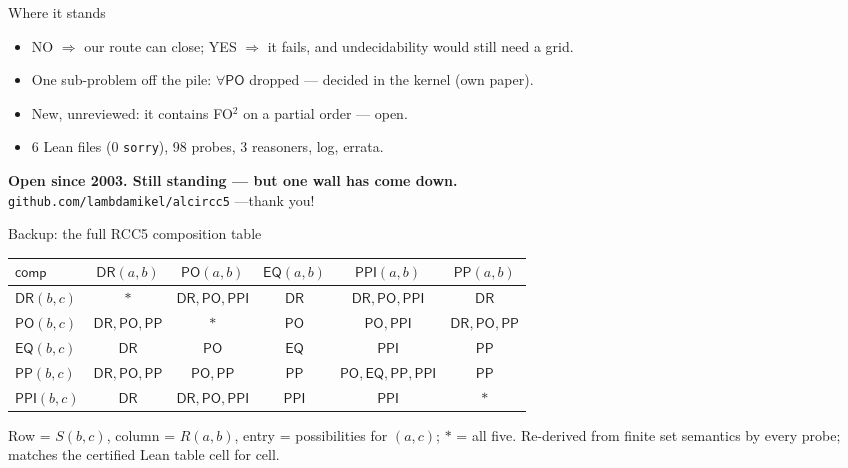 \documentclass[aspectratio=169,11pt]{beamer}
\newcommand{\DR}{\mathsf{DR}}
\newcommand{\PO}{\mathsf{PO}}
\newcommand{\PP}{\mathsf{PP}}
\newcommand{\PPI}{\mathsf{PPI}}
\newcommand{\EQ}{\mathsf{EQ}}
\newcommand{\comp}{\ensuremath{\mathsf{comp}}}
\begin{document}
\begin{frame}{Where it stands}
\begin{center}
\end{center}
\begin{itemize}
  \item NO $\Rightarrow$ our route can close; YES $\Rightarrow$ it fails, and
        undecidability would still need a grid.
  \item One \alert{sub-problem off the pile}: $\forall\PO$ dropped ---
        decided in the kernel (own paper).
  \item New, unreviewed: it \alert{contains} FO$^2$ on a partial order --- open.
  \item 6 Lean files (0 \texttt{sorry}), 98 probes, 3 reasoners, log, errata.
\end{itemize}
\vfill
\begin{center}
  \alert{\textbf{Open since 2003. Still standing --- but one wall has come
  down.}}\\[3pt]
  \small\texttt{github.com/lambdamikel/alcircc5} \quad---\quad thank you!
\end{center}
\end{frame}

\appendix
\begin{frame}{Backup: the full RCC5 composition table}
\begin{center}
\renewcommand{\arraystretch}{1.2}
\small
\begin{tabular}{l|ccccc}
\toprule
$\comp$ & $\DR(a,b)$ & $\PO(a,b)$ & $\EQ(a,b)$ & $\PPI(a,b)$ & $\PP(a,b)$ \\
\midrule
$\DR(b,c)$ & $*$ & $\DR,\PO,\PPI$ & $\DR$ & $\DR,\PO,\PPI$ & $\DR$ \\
$\PO(b,c)$ & $\DR,\PO,\PP$ & $*$ & $\PO$ & $\PO,\PPI$ & $\DR,\PO,\PP$ \\
$\EQ(b,c)$ & $\DR$ & $\PO$ & $\EQ$ & $\PPI$ & $\PP$ \\
$\PP(b,c)$ & $\DR,\PO,\PP$ & $\PO,\PP$ & $\PP$ & $\PO,\EQ,\PP,\PPI$ & $\PP$ \\
$\PPI(b,c)$ & $\DR$ & $\DR,\PO,\PPI$ & $\PPI$ & $\PPI$ & $*$ \\
\bottomrule
\end{tabular}
\end{center}
\vfill
{\small Row = $S(b,c)$, column = $R(a,b)$, entry = possibilities for
$(a,c)$; $*$ = all five. Re-derived from finite set semantics by every
probe; matches the certified Lean table cell for cell.}
\end{frame}
\end{document}
